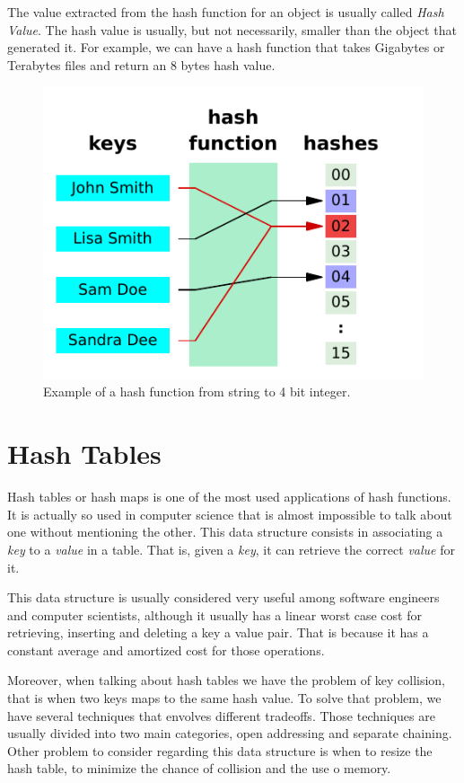 The value extracted from the hash function for an object is usually called \textit{Hash Value}. The hash value is usually, but not necessarily, smaller than the object that generated it. For example, we can have a hash function that takes Gigabytes or Terabytes files and return an 8 bytes hash value.

\begin{figure}[h!]
  \centering
  \includegraphics[width=12cm]{figuras/hash-function.pdf}
  \caption{Example of a hash function from string to 4 bit integer. }
\end{figure}

\section{Hash Tables}

Hash tables or hash maps is one of the most used applications of hash functions. It is actually so used in computer science that is almost impossible to talk about one without mentioning the other. This data structure consists in associating a \textit{key} to a \textit{value} in a table. That is, given a \textit{key}, it can retrieve the correct \textit{value} for it.

This data structure is usually considered very useful among software engineers and computer scientists, although it usually has a linear worst case cost for retrieving, inserting and deleting a key a value pair. That is because it has a constant average and amortized cost for those operations.

Moreover, when talking about hash tables we have the problem of key collision, that is when two keys maps to the same hash value. To solve that problem, we have several techniques that envolves different tradeoffs. Those techniques are usually divided into two main categories, open addressing and separate chaining. Other problem to consider regarding this data structure is when to resize the hash table, to minimize the chance of collision and the use o memory.

